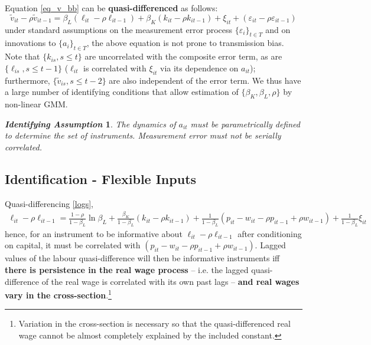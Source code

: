\documentclass[11pt]{article}
\newtheorem*{idass}{\textit{Identifying Assumption}}
\begin{document}
Equation \eqref{eq_v_bb} can be \textbf{quasi-differenced} as follows:
\begin{equation*}
	\tilde{v}_{it} - \rho \tilde{v}_{it-1} = \beta_L (\ell_{it} - \rho\ell_{it-1}) + \beta_K (k_{it} - \rho k_{it-1}) + \xi_{it} + (\varepsilon_{it} - \rho\varepsilon_{it-1})
\end{equation*}
under standard assumptions on the measurement error process $\{\varepsilon_i\}_{t\in T}$ and on innovations to $\{a_i\}_{t\in T}$, the above equation is not prone to transmission bias.
Note that $\{k_{is}, s\leq t\}$ are uncorrelated with the composite error term, as are $\{\ell_{is}, s\leq t-1\}$ ($\ell_{it}$ is correlated with $\xi_{it}$ via its dependence on $a_{it}$); furthermore, $\{\tilde{v}_{is}, s\leq t-2\}$ are also independent of the error term.
We thus have a large number of identifying conditions that allow estimation of $\{\beta_K, \beta_L, \rho\}$ by non-linear GMM.
\begin{idass}
	The dynamics of $a_{it}$ must be parametrically defined to determine the set of instruments. Measurement error must not be serially correlated.
\end{idass}

\subsection*{Identification - Flexible Inputs}

Quasi-differencing \eqref{logs},
\begin{equation*}
	\begin{gathered}
				\ell_{it} - \rho \ell_{it-1} = \frac{1 - \rho}{1 - \beta_L}\ln \beta_L + \frac{\beta_K}{1 - \beta_L} (k_{it} - \rho k_{it-1}) + \frac{1}{1 - \beta_L}(p_{it} - w_{it} - \rho p_{it-1} +\rho w_{it-1}) + \frac{1}{1 - \beta_L}\xi_{it}
	\end{gathered}
\end{equation*}
hence, for an instrument to be informative about $\ell_{it} - \rho \ell_{it-1}$ after conditioning on capital, it must be correlated with $(p_{it} - w_{it} - \rho p_{it-1} +\rho w_{it-1})$.
Lagged values of the labour quasi-difference will then be informative instruments iff \textbf{there is persistence in the real wage process} -- i.e. the lagged quasi-difference of the real wage is correlated with its own past lags -- \textbf{and real wages vary in the cross-section}.\footnote{Variation in the cross-section is necessary so that the quasi-differenced real wage cannot be almost completely explained by the included constant.} \\
\end{document}
